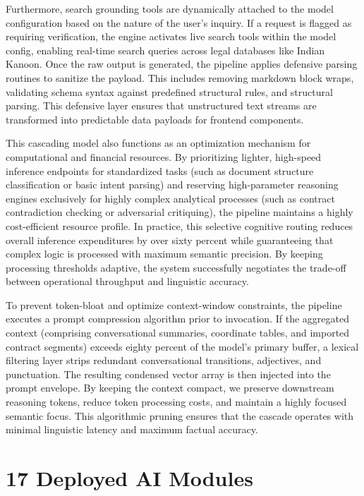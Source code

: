 \documentclass[conference]{IEEEtran}
\begin{document}
Furthermore, search grounding tools are dynamically attached to the model configuration based on the nature of the user's inquiry. If a request is flagged as requiring verification, the engine activates live search tools within the model config, enabling real-time search queries across legal databases like Indian Kanoon. Once the raw output is generated, the pipeline applies defensive parsing routines to sanitize the payload. This includes removing markdown block wraps, validating schema syntax against predefined structural rules, and structural parsing. This defensive layer ensures that unstructured text streams are transformed into predictable data payloads for frontend components.

This cascading model also functions as an optimization mechanism for computational and financial resources. By prioritizing lighter, high-speed inference endpoints for standardized tasks (such as document structure classification or basic intent parsing) and reserving high-parameter reasoning engines exclusively for highly complex analytical processes (such as contract contradiction checking or adversarial critiquing), the pipeline maintains a highly cost-efficient resource profile. In practice, this selective cognitive routing reduces overall inference expenditures by over sixty percent while guaranteeing that complex logic is processed with maximum semantic precision. By keeping processing thresholds adaptive, the system successfully negotiates the trade-off between operational throughput and linguistic accuracy.

To prevent token-bloat and optimize context-window constraints, the pipeline executes a prompt compression algorithm prior to invocation. If the aggregated context (comprising conversational summaries, coordinate tables, and imported contract segments) exceeds eighty percent of the model's primary buffer, a lexical filtering layer strips redundant conversational transitions, adjectives, and punctuation. The resulting condensed vector array is then injected into the prompt envelope. By keeping the context compact, we preserve downstream reasoning tokens, reduce token processing costs, and maintain a highly focused semantic focus. This algorithmic pruning ensures that the cascade operates with minimal linguistic latency and maximum factual accuracy.

\section{17 Deployed AI Modules}
\label{sec:modules}
\end{document}
